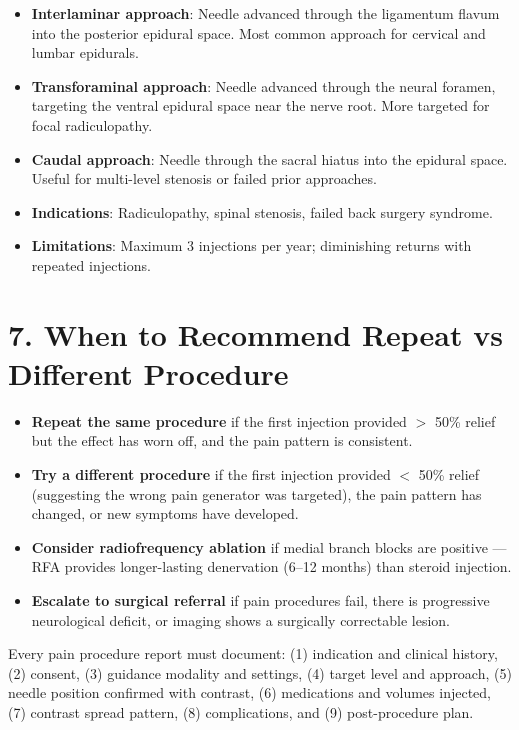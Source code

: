 \begin{itemize}
  \item \textbf{Interlaminar approach}: Needle advanced through the ligamentum flavum into the posterior epidural space. Most common approach for cervical and lumbar epidurals.
  \item \textbf{Transforaminal approach}: Needle advanced through the neural foramen, targeting the ventral epidural space near the nerve root. More targeted for focal radiculopathy.
  \item \textbf{Caudal approach}: Needle through the sacral hiatus into the epidural space. Useful for multi-level stenosis or failed prior approaches.
  \item \textbf{Indications}: Radiculopathy, spinal stenosis, failed back surgery syndrome.
  \item \textbf{Limitations}: Maximum 3 injections per year; diminishing returns with repeated injections.
\end{itemize}

\section{7. When to Recommend Repeat vs Different Procedure}

\begin{itemize}
  \item \textbf{Repeat the same procedure} if the first injection provided $>$ 50\% relief but the effect has worn off, and the pain pattern is consistent.
  \item \textbf{Try a different procedure} if the first injection provided $<$ 50\% relief (suggesting the wrong pain generator was targeted), the pain pattern has changed, or new symptoms have developed.
  \item \textbf{Consider radiofrequency ablation} if medial branch blocks are positive --- RFA provides longer-lasting denervation (6--12 months) than steroid injection.
  \item \textbf{Escalate to surgical referral} if pain procedures fail, there is progressive neurological deficit, or imaging shows a surgically correctable lesion.
\end{itemize}

\begin{pearlbox}
Every pain procedure report must document: (1) indication and clinical history, (2) consent, (3) guidance modality and settings, (4) target level and approach, (5) needle position confirmed with contrast, (6) medications and volumes injected, (7) contrast spread pattern, (8) complications, and (9) post-procedure plan.
\end{pearlbox}


